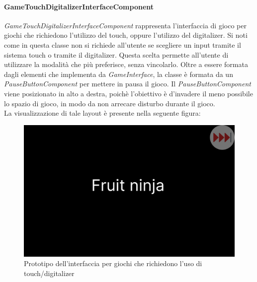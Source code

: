 \paragraph{GameTouchDigitalizerInterfaceComponent}
\emph{GameTouchDigitalizerInterfaceComponent} rappresenta l'interfaccia di gioco per giochi che richiedono l'utilizzo del touch, oppure l'utilizzo del digitalizer.
Si noti come in questa classe non si richiede all'utente se scegliere un input tramite il sistema touch o tramite il digitalizer. Questa scelta permette all'utente di utilizzare la modalità che più preferisce, senza vincolarlo.
Oltre a essere formata dagli elementi che implementa da \emph{GameInterface}, la classe è formata da un \emph{PauseButtonComponent} per mettere in pausa il gioco.
Il \emph{PauseButtonComponent} viene posizionato in alto a destra, poichè l'obiettivo è d'invadere il meno possibile lo spazio di gioco, in modo da non arrecare disturbo durante il gioco.\\
La visualizzazione di tale layout è presente nella seguente figura:
\begin{figure}[h]
    \centering
    \includegraphics[width=340pt]{images/prog/TouchDigitMockup.png}
    \caption{Prototipo dell'interfaccia per giochi che richiedono l'uso di touch/digitalizer}
    \label{fig:touchDigit}
\end{figure}
\newpage
